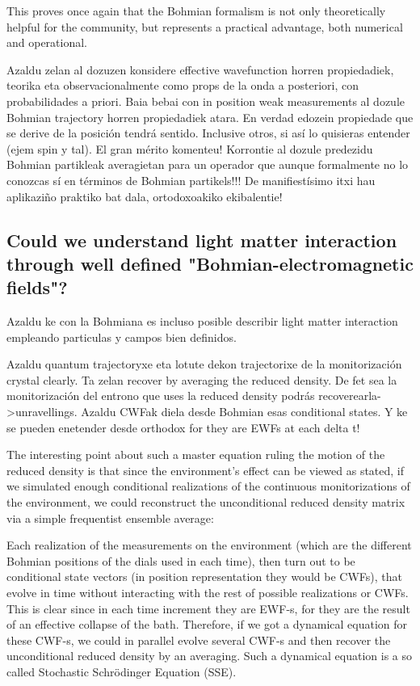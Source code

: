 \documentclass[11pt, a4paper]{article} %
\begin{document}
This proves once again that the Bohmian formalism is not only theoretically helpful for the community, but represents a practical advantage, both numerical and operational.

Azaldu zelan al dozuzen konsidere effective wavefunction horren propiedadiek, teorika eta observacionalmente como props de la onda a posteriori, con probabilidades a priori.
Baia bebai con in position weak measurements al dozule Bohmian trajectory horren propiedadiek atara. En verdad edozein propiedade que se derive de la posición tendrá sentido. Inclusive otros, si así lo quisieras entender (ejem spin y tal). El gran mérito komenteu! Korrontie al dozule predezidu Bohmian partikleak averagietan para un operador que aunque formalmente no lo conozcas sí en términos de Bohmian partikels!!! De manifiestísimo itxi hau aplikaziño praktiko bat dala, ortodoxoakiko ekibalentie!


\subsection*{Could we understand light matter interaction through well defined "Bohmian-electromagnetic fields"?}

Azaldu ke con la Bohmiana es incluso posible describir light matter interaction empleando particulas y campos bien definidos.


\newpage
Azaldu quantum trajectoryxe eta lotute dekon trajectorixe de la monitorización crystal clearly. Ta zelan recover by averaging the reduced density. De fet sea la monitorización del entrono que uses la reduced density podrás recoverearla->unravellings. Azaldu CWFak diela desde Bohmian esas conditional states. Y ke se pueden enetender desde orthodox for they are EWFs at each delta t!

The interesting point about such a master equation ruling the motion of the reduced density is that since the environment's effect can be viewed as stated, if we simulated enough conditional realizations of the continuous monitorizations of the environment, we could reconstruct the unconditional reduced density matrix via a simple frequentist ensemble average:


Each realization of the measurements on the environment (which are the different Bohmian positions of the dials used in each time), then turn out to be conditional state vectors (in position representation they would be CWFs), that evolve in time without interacting with the rest of possible realizations or CWFs. This is clear since in each time increment they are EWF-s, for they are the result of an effective collapse of the bath. Therefore, if we got a dynamical equation for these CWF-s, we could in parallel evolve several CWF-s and then recover the unconditional reduced density by an averaging. Such a dynamical equation is a so called Stochastic Schrödinger Equation (SSE).
\end{document}
